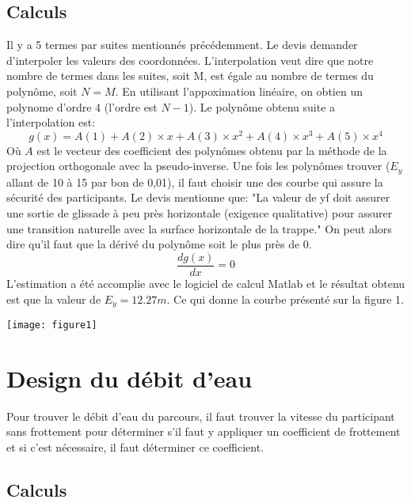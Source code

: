 \documentclass[12pt]{article}
\begin{document}
\subsection{Calculs}
Il y a 5 termes par suites mentionnés précédemment. Le devis demander d'interpoler les valeurs des coordonnées. L'interpolation veut dire que notre nombre de termes dans les suites, soit M, est égale au nombre de termes du polynôme, soit $N=M$. En utilisant l'appoximation linéaire, on obtien un polynome d'ordre 4 (l'ordre est $N-1$). Le polynôme obtenu suite a l'interpolation est: 
\begin{equation}
g(x) = A(1) + A(2)\times x + A(3)\times x^2 + A(4)\times x^3 + A(5)\times x^4 
\end{equation}
Où $A$ est le vecteur des coefficient des polynômes obtenu par la méthode de la projection orthogonale avec la pseudo-inverse. 
\newpage
\noindent
Une fois les polynômes trouver ($E_y$ allant de 10 à 15 par bon de 0,01), il faut choisir une des courbe qui assure la sécurité des participants. Le devis mentionne que: "La valeur de yf doit assurer une sortie de glissade à peu près horizontale (exigence qualitative) pour assurer une transition naturelle avec la surface horizontale de la trappe." On peut alors dire qu'il faut que la dérivé du polynôme soit le plus près de 0. 
\begin{equation}
\frac{dg(x)}{dx} = 0
\end{equation}
L'estimation a été accomplie avec le logiciel de calcul Matlab et le résultat obtenu est que la valeur de $E_y = 12.27m$. Ce qui donne la courbe présenté sur la figure 1.

\begin{center}
	\texttt{[image: figure1]}
\end{center}


\section{Design du débit d'eau}
Pour trouver le débit d'eau du parcours, il faut trouver la vitesse du participant sans frottement pour déterminer s'il faut y appliquer un coefficient de frottement et si c'est nécessaire, il faut déterminer ce coefficient.
\subsection{Calculs}
\end{document}
